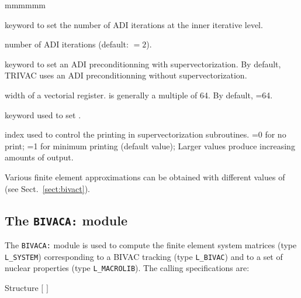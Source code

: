 \begin{ListeDeDescription}{mmmmmm}
\item[\moc{ADI}] keyword to set the number of ADI iterations at the inner
iterative level.

\item[\dusa{nadi}] number of ADI iterations (default:  $=2$).

\item[\moc{VECT}] keyword to set an ADI preconditionning with
supervectorization. By default, TRIVAC uses an ADI preconditionning without
supervectorization.

\item[\dusa{iseg}] width of a vectorial register.  is generally a multiple of 64. By default, =64.

\item[\moc{PRTV}] keyword used to set .

\item[\dusa{impv}] index used to control the  printing in supervectorization
subroutines. =0 for no print; =1 for minimum printing (default value); Larger
values produce increasing amounts of output.

\end{ListeDeDescription}
Various finite element approximations can be obtained with different values of  (see Sect.~\ref{sect:bivact}).
\clearpage

\subsection{The {\tt BIVACA:} module}

The {\tt BIVACA:} module is used to compute the finite element system matrices (type {\tt L\_SYSTEM}) corresponding to a BIVAC {\sc tracking} (type {\tt L\_BIVAC}) and to a set of nuclear properties (type {\tt L\_MACROLIB}). The calling specifications are:

\begin{DataStructure}{Structure }
 \moc{:=}  $[$  $]$    \moc{::} 
\end{DataStructure}

